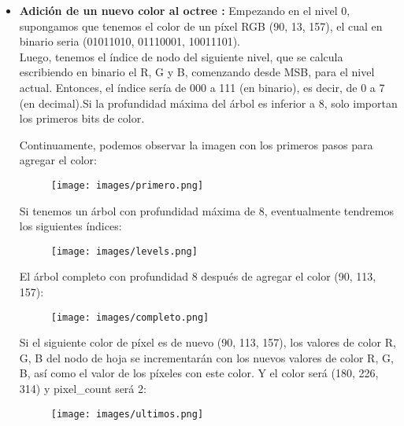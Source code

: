 \begin{itemize}
    \item \textbf{Adición de un nuevo color al octree :}
    Empezando en el nivel 0, supongamos que tenemos el color de un píxel RGB (90, 13, 157), el cual en binario seria (01011010, 01110001, 10011101).\\
    Luego, tenemos el índice de nodo del siguiente nivel, que se calcula escribiendo en binario el R, G y B, comenzando desde MSB, para el nivel actual. Entonces, el índice sería de 000 a 111 (en binario), es decir, de 0 a 7 (en decimal).Si la profundidad máxima del árbol es inferior a 8, solo importan los primeros bits de color.
    
    Continuamente, podemos observar la imagen con los primeros pasos para agregar el color:
    
    \begin{figure}[H]
      \centering
      \texttt{[image: images/primero.png]}
      \label{fig:act-5}
    \end{figure}
    
    Si tenemos un árbol con profundidad máxima de 8, eventualmente tendremos los siguientes índices:
    
    \begin{figure}[H]
      \centering
      \texttt{[image: images/levels.png]}
      \label{fig:act-5}
    \end{figure}
    
    El árbol completo con profundidad 8 después de agregar el color (90, 113, 157):
    
    \begin{figure}[H]
      \centering
      \texttt{[image: images/completo.png]}
      \label{fig:act-5}
    \end{figure}
    
    Si el siguiente color de píxel es de nuevo (90, 113, 157), los valores de color R, G, B del nodo de hoja se incrementarán con los nuevos valores de color R, G, B, así como el valor de los píxeles con este color. Y el color será (180, 226, 314) y pixel\_count será 2:
    
    \begin{figure}[H]
      \centering
      \texttt{[image: images/ultimos.png]}
      \label{fig:act-5}
    \end{figure}
    

\end{itemize}
